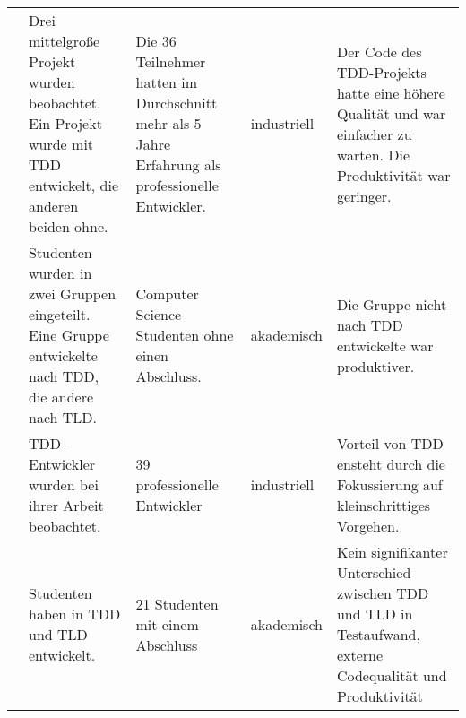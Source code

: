 \begin{table*}[t]
\begin{tabularx}{\textwidth}{@{}Xp{}p{}p{}p{}@{}}
\cite{Dogsa2011TheStudy}                     & Drei mittelgroße Projekt wurden beobachtet. Ein Projekt wurde mit TDD entwickelt, die anderen beiden ohne.                                                                                                                               & Die 36 Teilnehmer hatten im Durchschnitt mehr als 5 Jahre Erfahrung als professionelle Entwickler.                                                             & industriell               & Der Code des TDD-Projekts hatte eine höhere Qualität und war einfacher zu warten. Die Produktivität war geringer.                                                                                                                                               \\
\cite{Erdogmus2005OnProgramming}             & Studenten wurden in zwei Gruppen eingeteilt. Eine Gruppe entwickelte nach TDD, die andere nach TLD.                                                                                                                                      & Computer Science Studenten ohne einen Abschluss.                                                                                                               & akademisch                & Die Gruppe nicht nach TDD entwickelte war produktiver.                                                                                                                                                                                                          \\
\cite{Fucci2016ATest-Last}                   & TDD-Entwickler wurden bei ihrer Arbeit beobachtet.                                                                                                                                                                                       & 39 professionelle Entwickler                                                                                                                                   & industriell               & Vorteil von TDD ensteht durch die Fokussierung auf kleinschrittiges Vorgehen.                                                                                                                                                                                   \\
\cite{Fucci2016AnApproach}                   & Studenten haben in TDD und TLD entwickelt.                                                                                                                                                                                               & 21 Studenten mit einem Abschluss                                                                                                                               & akademisch                & Kein signifikanter Unterschied zwischen TDD und TLD in Testaufwand, externe Codequalität und Produktivität                                                                                                                                                      \\

\end{tabularx}
\end{table*}
